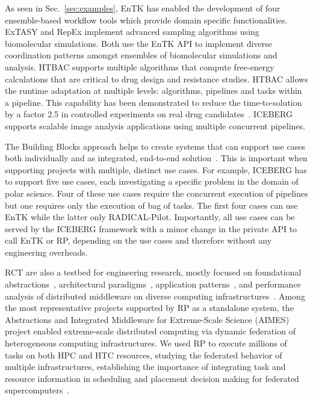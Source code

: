 \documentclass[preprint,12pt, a4paper]{elsarticle}
\begin{document}
As seen in Sec.~\ref{sec:examples}, EnTK has enabled the development of four
ensemble-based workflow tools which provide domain specific functionalities.
ExTASY and RepEx implement advanced sampling algorithms using biomolecular
simulations. Both use the EnTK API to implement  diverse coordination patterns
amongst ensembles of biomolecular simulations and analysis. HTBAC supports
multiple algorithms that compute free-energy calculations that are critical to
drug design and resistance studies. HTBAC allows the runtime adaptation at
multiple levels: algorithms, pipelines and tasks within a pipeline. This
capability has been demonstrated to reduce the time-to-solution by a factor 2.5
in controlled experiments on real drug candidates~\citep{dakka2018concurrent}.
ICEBERG~\cite{paraskevakos2019workflow} supports scalable image analysis
applications using multiple concurrent pipelines.

The Building Blocks approach helps to create systems that can support use cases
both individually and as integrated, end-to-end
solution~\cite{turilli2019middleware}. This is important when supporting
projects with multiple, distinct use cases. For example, ICEBERG has to support
five use cases, each investigating a specific problem in the domain of polar
science. Four of these use cases require the concurrent execution of pipelines
but one requires only the execution of bag of tasks. The first four cases can
use EnTK while the latter only RADICAL-Pilot. Importantly, all use cases can be
served by the ICEBERG framework with a minor change in the private API to call
EnTK or RP, depending on the use cases and therefore without any engineering
overheads.


RCT are also a testbed for engineering research, mostly focused on foundational
abstractions~\cite{turilli2017evaluating}, architectural
paradigms~\cite{turilli2018comprehensive}, application
patterns~\cite{balasubramanian2016extasy,balasubramanian2018harnessing}, and
performance analysis of distributed middleware on diverse computing
infrastructures~\cite{turilli2017evaluating,dakka2018high}. Among the most
representative projects supported by RP as a standalone system, the Abstractions
and Integrated Middleware for Extreme-Scale Science (AIMES) project enabled
extreme-scale distributed computing via dynamic federation of heterogeneous
computing infrastructures. We used RP to execute millions of tasks on both HPC
and HTC resources, studying the federated behavior of multiple infrastructures,
establishing the importance of integrating task and resource information in
scheduling and placement decision making for federated
supercomputers~\cite{turilli2016integrating}.
\end{document}
